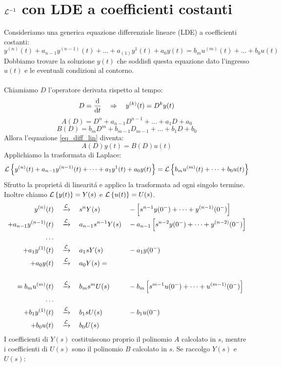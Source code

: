 \documentclass[../main.tex]{subfiles}
\begin{document}
	\section{$\mathcal{L}^{-1}$ con LDE a coefficienti costanti}
	Consideriamo una generica equazione differenziale lineare (LDE) a coefficienti costanti:
	\begin{equation} \label{eq_diff_lin}
		y^{(n)}(t) + a_{n-1}y^{(n-1)}(t) + \dots + a_{(1)}y^{1}(t) + a_{0}y(t) = b_{m}u^{(m)}(t) + \dots + b_0 u(t)
	\end{equation}
	Dobbiamo trovare la soluzione $ y(t) $ che soddisfi questa equazione dato l'ingresso $ u(t) $ e le eventuali condizioni al contorno.\\
	\medskip\\
	Chiamiamo $ D $ l'operatore derivata rispetto al tempo:
	\[ D = \frac{\mathrm{d} }{\mathrm{d} t} \quad \Rightarrow \quad y^{(k)}(t) = D^k y(t) \]
	\[ A(D) = D^n + a_{n-1} D^{n-1} + \dots + a_1 D + a_0 \]
	\[ B(D) = b_m D^m + b_{m-1} D_{m-1} + \dots + b_1 D + b_0 \]
	Allora l'equazione \ref{eq_diff_lin} diventa:
	\[ A(D) y(t) = B(D) u(t) \]
	Applichiamo la trasformata di Laplace:
	\[ \mathcal{L} \left\lbrace y^{(n)}(t) + a_{n-1}y^{(n-1)}(t) + \dots + a_{1}y^{1}(t) + a_{0}y(t) \right\rbrace = \mathcal{L} \left\lbrace b_{m}u^{(m)}(t) + \dots + b_0 u(t) \right\rbrace \]
	Sfrutto la propriet\'{a} di linearit\'{a} e applico la trasformata ad ogni singolo termine.\\
	Inoltre chiamo $ \mathcal{L} \left\lbrace y(t) \right\rbrace = Y(s) $ e $ \mathcal{L} \left\lbrace u(t) \right\rbrace = U(s) $.
	\allowdisplaybreaks
	\begin{align*}
		\Lapl{y^{(n)}(t)&}{s^n Y(s) &&- \left[ s^{n-1} y(0^-) + \dots + y^{(n-1)}(0^-) \right] }\\
		\Lapl{+ a_{n-1}y^{(n-1)}(t)&}{a_{n-1} s^{n-1} Y(s) &&- a_{n-1} \left[ s^{n-2} y(0^-) + \dots + y^{(n-2)}(0^-) \right] }\\
		\smallskip\dots\smallskip\\
		\Lapl{+ a_{1}y^{(1)}(t)&}{a_{1} s Y(s) &&- a_{1} y(0^-) }\\
		\Lapl{+ a_{0}y(t)&}{a_{0} Y(s) } = \\\medskip\\
		\Lapl{ = b_m u^{(m)}(t)& }{b_m s^m U(s) &&- b_m \left[ s^{m-1} u(0^-) + \dots + u^{(m-1)}(0^-) \right] }\\
		\smallskip\dots\smallskip\\
		\Lapl{+ b_{1}y^{(1)}(t)&}{b_{1} s U(s) &&- b_{1} u(0^-) }\\
		\Lapl{+ b_{0}u(t)&}{b_{0} U(s) }
	\end{align*}
	I coefficienti di $ Y(s) $ costituiscono proprio il polinomio $ A $ calcolato in $ s $, mentre i coefficienti di $ U(s) $ sono il polinomio $ B $ calcolato in $ s $. Se raccolgo $ Y(s) $ e $ U(s) $:
\end{document}

